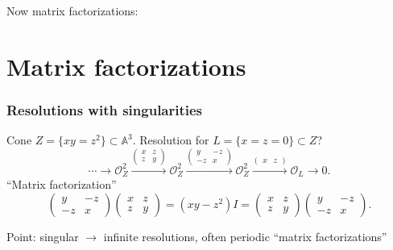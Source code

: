 \documentclass{beamer}
\newcommand{\A}{\mathbb{A}}
\renewcommand{\O}{\mathcal{O}}
\begin{document}
\begin{frame}
    Now matrix factorizations:
\end{frame}

\section{Matrix factorizations}

\begin{frame}
    \frametitle{Resolutions with singularities}

    Cone $Z=\{xy=z^2\}\subset\A^3$. \pause
    Resolution for $L=\{x=z=0\}\subset Z$? \pause
    \begin{equation*}
        \cdots \to
        \O_Z^2 \xrightarrow{\begin{pmatrix}
            x & z \\ z & y
        \end{pmatrix}}
        \O_Z^2 \xrightarrow{\begin{pmatrix}
            y & -z \\ -z & x
        \end{pmatrix}}
        \O_Z^2 \xrightarrow{\begin{pmatrix}
            x & z
        \end{pmatrix}}
        \O_L\to0.
    \end{equation*} \pause
    ``Matrix factorization''
    \begin{equation*}
        \begin{pmatrix}
            y & -z \\ -z & x
        \end{pmatrix}
        \begin{pmatrix}
            x & z \\ z & y
        \end{pmatrix}
            = (xy-z^2)I =
        \begin{pmatrix}
            x & z \\ z & y
        \end{pmatrix}
        \begin{pmatrix}
            y & -z \\ -z & x
        \end{pmatrix}.
    \end{equation*} \pause

    Point: singular $\to$ infinite resolutions, often periodic ``matrix
    factorizations''
\end{frame}
\end{document}
